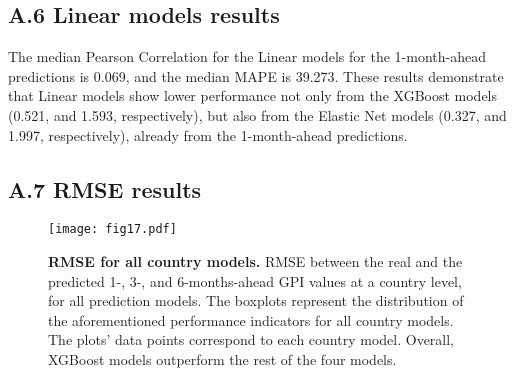 \documentclass{bmcart}
\begin{document}
\subsection*{\textbf{A.6 Linear models results}}
\label{appendix6}

The median Pearson Correlation for the Linear models for the 1-month-ahead predictions is 0.069, and the median MAPE is 39.273. These results demonstrate that Linear models show lower performance not only from the XGBoost models (0.521, and 1.593, respectively), but also from the Elastic Net models (0.327, and 1.997, respectively), already from the 1-month-ahead predictions.

\newpage

\subsection*{\textbf{A.7 RMSE results}}
 
\label{appendix7}
\begin{figure}[htp]
\centering
\texttt{[image: fig17.pdf]}
\caption{\textbf{RMSE for all country models.} RMSE between the real and the predicted 1-, 3-, and 6-months-ahead GPI values at a country level, for all prediction models. The boxplots represent the distribution of the aforementioned performance indicators for all country models. The plots' data points correspond to each country model. Overall, XGBoost models outperform the rest of the four models.}
\label{fig:rmse}
\end{figure}
\end{document}
